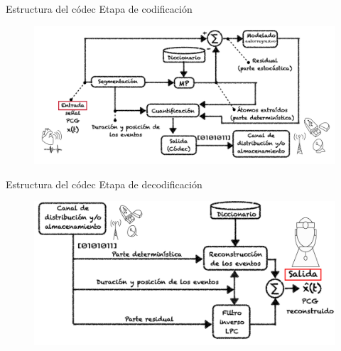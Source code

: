 \documentclass[xcolor=table]{beamer}
\begin{document}
\begin{frame}{Estructura del c\'odec}
Etapa de codificaci\'on
	\begin{figure}
		\centering
		\includegraphics[scale=0.28]{codificador2.pdf}
	\end{figure}
\end{frame}

\begin{frame}{Estructura del c\'odec}
Etapa de decodificaci\'on
	\begin{figure}
		\centering
		\includegraphics[scale=0.34]{decodificador2.pdf}
	\end{figure}
\end{frame}
%	
\end{document}
